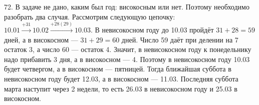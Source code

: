 72. В задаче не дано, каким был год: високосным или нет. Поэтому необходимо разобрать два случая. Рассмотрим следующую цепочку:
$10.01\stackrel{+31}{\rightarrow}10.02\stackrel{+28(29)}{\rightarrow}10.03.$ В невисокосном году до 10.03 пройдёт $31+28=59$ дней, а в високосном --- $31+29=60$ дней. Число 59 даёт при делении на 7 остаток 3, а число 60 --- остаток 4. Значит, в невисокосном году к понедельнику надо прибавить 3 дня, а в високосном --- 4. Поэтому в невисокосном году 10.03 будет четвергом, а в високосном --- пятницей. Тогда ближайшая суббота в невисокосном году будет 12.03, а в високосном --- 11.03. Последняя суббота марта наступит через 2 недели, то есть 26.03 в невисокосном году и 25.03 в високосном.\\
